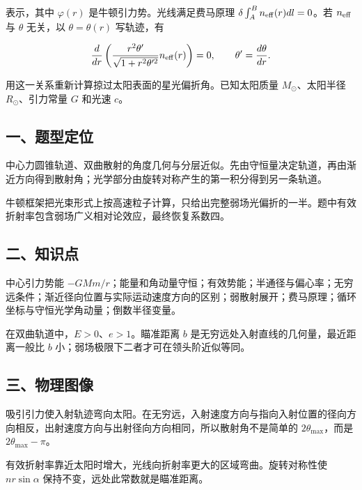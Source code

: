 \documentclass[12pt,a4paper,fontset=fandol]{ctexart}
\begin{document}
表示，其中 \(\varphi(r)\) 是牛顿引力势。光线满足费马原理
\(\delta\int_A^B n_{\rm eff}(r)dl=0\)。若 \(n_{\rm eff}\) 与 \(\theta\)
无关，以 \(\theta=\theta(r)\) 写轨迹，有

\[\frac d{dr}\left(
\frac{r^2\theta'}{\sqrt{1+r^2\theta'^2}}n_{\rm eff}(r)
\right)=0,\qquad\theta'=\frac{d\theta}{dr}.\]

用这一关系重新计算掠过太阳表面的星光偏折角。已知太阳质量
\(M_\odot\)、太阳半径 \(R_\odot\)、引力常量 \(G\) 和光速 \(c\)。

\subsection{一、题型定位}\label{ux4e00ux9898ux578bux5b9aux4f4d-5}

中心力圆锥轨道、双曲散射的角度几何与分层近似。先由守恒量决定轨道，再由渐近方向得到散射角；光学部分由旋转对称产生的第一积分得到另一条轨道。

牛顿框架把光束形式上按高速粒子计算，只给出完整弱场光偏折的一半。题中有效折射率包含弱场广义相对论效应，最终恢复系数四。

\subsection{二、知识点}\label{ux4e8cux77e5ux8bc6ux70b9-5}

中心引力势能
\(-GMm/r\)；能量和角动量守恒；有效势能；半通径与偏心率；无穷远条件；渐近径向位置与实际运动速度方向的区别；弱散射展开；费马原理；循环坐标与守恒光学角动量；倒数半径变量。

在双曲轨道中，\(E>0\)、\(e>1\)。瞄准距离 \(b\)
是无穷远处入射直线的几何量，最近距离一般比 \(b\)
小；弱场极限下二者才可在领头阶近似等同。

\subsection{三、物理图像}\label{ux4e09ux7269ux7406ux56feux50cf-5}

吸引引力使入射轨迹弯向太阳。在无穷远，入射速度方向与指向入射位置的径向方向相反，出射速度方向与出射径向方向相同，所以散射角不是简单的
\(2\theta_{\max}\)，而是 \(2\theta_{\max}-\pi\)。

有效折射率靠近太阳时增大，光线向折射率更大的区域弯曲。旋转对称性使
\(nr\sin\alpha\) 保持不变，远处此常数就是瞄准距离。
\end{document}
